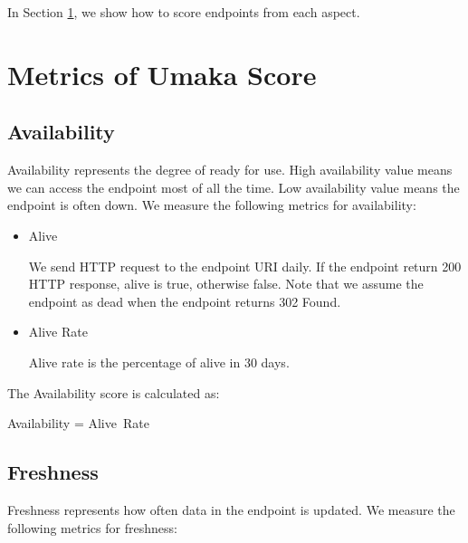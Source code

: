 \documentclass[11pt,a4paper]{article}
\begin{document}
In Section \ref{metrics}, we show how to score endpoints from each aspect.

\section{Metrics of Umaka Score} \label{metrics}

\subsection{Availability}

Availability represents the degree of ready for use. High availability value means we can access the endpoint most of all the time. Low availability value means the endpoint is often down.
We measure the following metrics for availability:

\begin{itemize}

\item Alive

We send HTTP request to the endpoint URI daily. If the endpoint return 200 HTTP response, alive is true, otherwise false.
Note that we assume the endpoint as dead when the endpoint returns 302 Found.

\item Alive Rate

Alive rate is the percentage of alive in 30 days.

\end{itemize}

The Availability score is calculated as:

\begin{mdframed}
  \center
Availability = Alive~Rate
\end{mdframed}

\subsection{Freshness}

Freshness represents how often data in the endpoint is updated.
We measure the following metrics for freshness:
\end{document}
